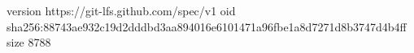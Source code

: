 version https://git-lfs.github.com/spec/v1
oid sha256:88743ae932c19d2dddbd3aa894016e6101471a96fbe1a8d7271d8b3747d4b4ff
size 8788
